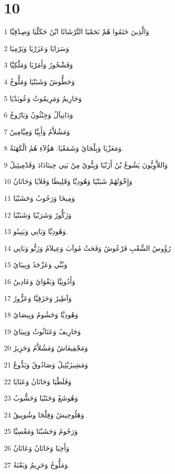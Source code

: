 \chapter{10}

\par 1 وَالَّذِينَ خَتَمُوا هُمْ نَحَمْيَا التِّرْشَاثَا ابْنُ حَكَلْيَا وَصِدْقِيَّا
\par 2 وَسَرَايَا وَعَزَرْيَا وَيَرْمِيَا
\par 3 وَفَشْحُورُ وَأَمَرْيَا وَمَلْكِيَّا
\par 4 وَحَطُّوشُ وَشَبَنْيَا وَمَلُّوخُ
\par 5 وَحَارِيمُ وَمَرِيمُوثُ وَعُوبَدْيَا
\par 6 وَدَانِيآلُ وَجِنْثُونُ وَبَارُوخُ
\par 7 وَمَشُلاَّمُ وَأَبِيَّا وَمِيَّامِينُ
\par 8 وَمَعَزْيَا وَبِلْجَايُ وَشَمَعْيَا. هَؤُلاَءِ هُمُ الْكَهَنَةُ.
\par 9 وَاللاَّوِيُّونَ يَشُوعُ بْنُ أَزَنْيَا وَبِنُّويُ مِنْ بَنِي حِينَادَادَ وَقَدْمِيئِيلُ
\par 10 وَإِخْوَتُهُمْ شَبَنْيَا وَهُودِيَّا وَقَلِيطَا وَفَلاَيَا وَحَانَانُ
\par 11 وَمِيخَا وَرَحُوبُ وَحَشَبْيَا
\par 12 وَزَكُّورُ وَشَرَبْيَا وَشَبَنْيَا
\par 13 وَهُودِيَّا وَبَانِي وَبَنِينُو.
\par 14 رُؤُوسُ الشَّعْبِ فَرْعُوشُ وَفَحَثُ مُوآبَ وَعِيلاَمُ وَزَتُّو وَبَانِي
\par 15 وَبُنِّي وَعَزْجَدُ وَبِيبَايُ
\par 16 وَأَدُونِيَّا وَبَغْوَايُ وَعَادِينُ
\par 17 وَآطِيرُ وَحَزَقِيَّا وَعَزُّورُ
\par 18 وَهُودِيَّا وَحَشُومُ وَبِيصَايُ
\par 19 وَحَارِيفُ وَعَنَاثُوثُ وَنِيبَايُ
\par 20 وَمَجْفِيعَاشُ وَمَشُلاَّمُ وَحَزِيرُ
\par 21 وَمَشِيزَبْئِيلُ وَصَادُوقُ وَيَدُّوعُ
\par 22 وَفَلَطْيَا وَحَانَانُ وَعَنَايَا
\par 23 وَهُوشَعُ وَحَنَنْيَا وَحَشُّوبُ
\par 24 وَهَلُوحِيشُ وَفِلْحَا وشُوبِيقُ
\par 25 وَرَحُومُ وَحَشَبْنَا وَمَعْسِيَّا
\par 26 وَأَخِيَا وَحَانَانُ وَعَانَانُ
\par 27 وَمَلُّوخُ وَحَرِيمُ وَبَعْنَةُ.
